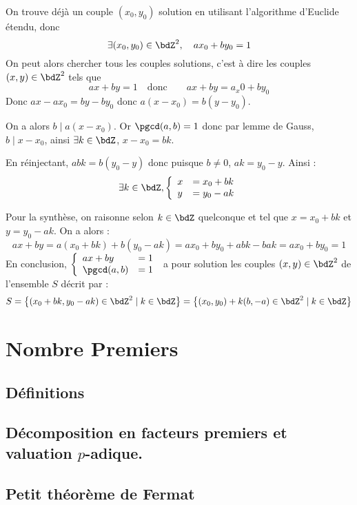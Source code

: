 \documentclass[a4paper,french,bookmarks]{article}
\begin{document}
\begin{enumerate}
    \ithand On trouve déjà un couple $(x_0, y_0)$ solution en utilisant l'algorithme d'Euclide étendu, donc
\[ \exists (x_0, y_0) \in \bdZ^2,\quad ax_0 + by_0 = 1\]
On peut alors chercher tous les couples solutions, c'est à dire les couples $(x, y) \in \bdZ^2$ tels que 
\[ ax + by = 1 \quad \text{donc} \qquad ax + by = a_x0 + by_0\]
Donc $ax - ax_0 = by - by_0$ donc $a(x - x_0) = b(y - y_0)$.

On a alors $b \mid a(x - x_0)$. Or $\pgcd (a, b) = 1$ donc par lemme de Gauss, $b \mid x - x_0$, ainsi $\exists k \in \bdZ$, $x- x_0 = bk$.

En réinjectant, $abk = b(y_0 - y)$ donc puisque $ b \neq 0$, $ak = y_0 - y$. Ainsi :
\[ \exists k \in \bdZ, \left\lbrace\begin{array}{ll}
    x &= x_0 + bk  \\
    y &= y_0 - ak
\end{array}\right.\]

\ithand Pour la synthèse, on raisonne selon $k \in \bdZ$ quelconque et tel que $x = x_0 + bk$ et $y = y_0 - ak$. On a alors :
\[ ax + by = a(x_0 + bk) + b(y_0 - ak) = ax_0 + by_0 + abk - bak = ax_0 + by_0 = 1\]
\ithand En conclusion, $\left\lbrace\begin{array}{ll}
    ax + by &= 1 \\
    \pgcd(a,b) &= 1 
\end{array}\right.$ a pour solution les couples $(x, y) \in \bdZ^2$ de l'ensemble $S$ décrit par :
\[ S = \left\{(x_0 + bk, y_0 - ak) \in \bdZ^2 \mid k \in \bdZ\right\} = \left\{(x_0, y_0)+ k(b, -a) \in \bdZ^2 \mid k \in \bdZ\right\}\]
\end{enumerate}


\section{Nombre Premiers}

\subsection{Définitions}
\subsection{Décomposition en facteurs premiers et valuation $p$-adique.}
\subsection{Petit théorème de Fermat}
\end{document}
